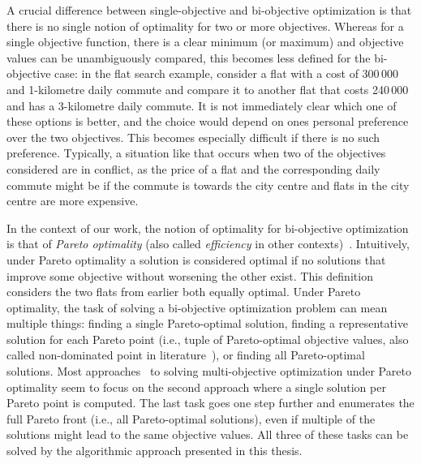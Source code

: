 A crucial difference between single-objective and bi-objective optimization is that there is no single notion of optimality for two or more objectives.
Whereas for a single objective function, there is a clear minimum (or maximum) and objective values can be unambiguously compared, this becomes less defined for the bi-objective case:
in the flat search example, consider a flat with a cost of 300\,000 \texteuro{} and 1-kilometre daily commute and compare it to another flat that costs 240\,000 \texteuro{} and has a 3-kilometre daily commute.
It is not immediately clear which one of these options is better, and the choice would depend on ones personal preference over the two objectives.
This becomes especially difficult if there is no such preference.
Typically, a situation like that occurs when two of the objectives considered are in conflict, as the price of a flat and the corresponding daily commute might be if the commute is towards the city centre and flats in the city centre are more expensive.

In the context of our work, the notion of optimality for bi-objective optimization is that of \emph{Pareto optimality} (also called \emph{efficiency} in other contexts)~\autocite{Ehrgott2005-2}.
Intuitively, under Pareto optimality a solution is considered optimal if no solutions that improve some objective without worsening the other exist.
This definition considers the two flats from earlier both equally optimal.
Under Pareto optimality, the task of solving a bi-objective optimization problem can mean multiple things:
finding a single Pareto-optimal solution, finding a representative solution for each Pareto point (i.e., tuple of Pareto-optimal objective values, also called non-dominated point in literature~\autocite{Ehrgott2005-2}), or finding all Pareto-optimal solutions.
Most approaches~\autocite{DBLP:conf/cp/SohBTB17,DBLP:conf/cp/JanotaMSM21,DBLP:conf/ijcai/Terra-NevesLM18a} to solving multi-objective optimization under Pareto optimality seem to focus on the second approach where a single solution per Pareto point is computed.
The last task goes one step further and enumerates the full Pareto front (i.e., all Pareto-optimal solutions), even if multiple of the solutions might lead to the same objective values.
All three of these tasks can be solved by the algorithmic approach presented in this thesis.

